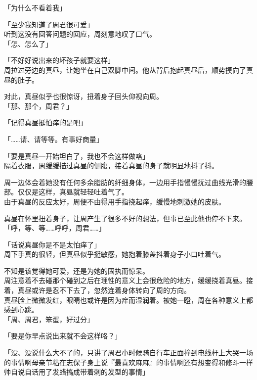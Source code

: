 「为什么不看着我」

「至少我知道了周君很可爱」\\

听到这没有回答问题的回应，周刻意地叹了口气。\\

「怎、怎么了」

「不好好说出来的坏孩子就要这样」\\

周拉过旁边的真昼，让她坐在自己双脚中间。他从背后抱起真昼后，顺势摸向了真昼的肚子。

对此，真昼似乎也很惊讶，扭着身子回头仰视向周。\\

「那、那个，周君？」

「记得真昼挺怕痒的是吧」

「……请、请等等。有事好商量」

「要是真昼一开始坦白了，我也不会这样做咯」\\

隔着衣服，周缓缓描过真昼的侧腹，接着真昼的身子就明显地抖了抖。

周一边体会着她没有任何多余脂肪的纤细身体，一边用手指慢慢抚过曲线光滑的腰部。仅仅是这样，真昼就轻轻吐着气了。\\

由于真昼的反应太好，周便不由得用手指挠起痒，缓慢地刺激她的皮肤。

真昼在怀里扭着身子，让周产生了很多不好的想法，但事已至此他也停不下来。\\

「呼，等、等……呼呼，周君……」

「话说真昼你是不是太怕痒了」\\

周下手真的很轻，但真昼似乎挺敏感，她抱着膝盖抖着身子小口吐着气。

不知是该觉得她可爱，还是为她的固执而惊呆。\\

周注意着不去碰那个碰到之后在理性的意义上会很危险的地方，缓缓挠着真昼。接着，真昼或许是忍不下去了，忽然连着身体转向了周的方向。\\

真昼脸上微微发红，眼睛也或许是因为痒而湿润着。被她一瞪，周在各种意义上都感到心跳。\\

「周、周君，笨蛋，好过分」

「要是你早点说出来就不会这样咯？」

「没、没说什么大不了的，只讲了周君小时候骑自行车正面撞到电线杆上大哭一场的事情啊母亲节粘在志保子身上说『最喜欢麻麻』的事情啊还有想变得和修斗一样帅自说自话用了发蜡搞成带着刺的发型的事情」

